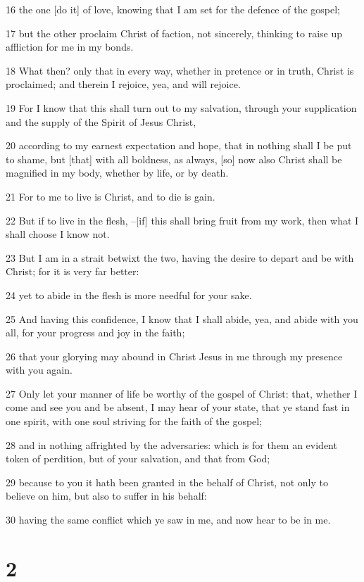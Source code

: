 \par 16 the one [do it] of love, knowing that I am set for the defence of the gospel;
\par 17 but the other proclaim Christ of faction, not sincerely, thinking to raise up affliction for me in my bonds.
\par 18 What then? only that in every way, whether in pretence or in truth, Christ is proclaimed; and therein I rejoice, yea, and will rejoice.
\par 19 For I know that this shall turn out to my salvation, through your supplication and the supply of the Spirit of Jesus Christ,
\par 20 according to my earnest expectation and hope, that in nothing shall I be put to shame, but [that] with all boldness, as always, [so] now also Christ shall be magnified in my body, whether by life, or by death.
\par 21 For to me to live is Christ, and to die is gain.
\par 22 But if to live in the flesh, --[if] this shall bring fruit from my work, then what I shall choose I know not.
\par 23 But I am in a strait betwixt the two, having the desire to depart and be with Christ; for it is very far better:
\par 24 yet to abide in the flesh is more needful for your sake.
\par 25 And having this confidence, I know that I shall abide, yea, and abide with you all, for your progress and joy in the faith;
\par 26 that your glorying may abound in Christ Jesus in me through my presence with you again.
\par 27 Only let your manner of life be worthy of the gospel of Christ: that, whether I come and see you and be absent, I may hear of your state, that ye stand fast in one spirit, with one soul striving for the faith of the gospel;
\par 28 and in nothing affrighted by the adversaries: which is for them an evident token of perdition, but of your salvation, and that from God;
\par 29 because to you it hath been granted in the behalf of Christ, not only to believe on him, but also to suffer in his behalf:
\par 30 having the same conflict which ye saw in me, and now hear to be in me.

\chapter{2}

